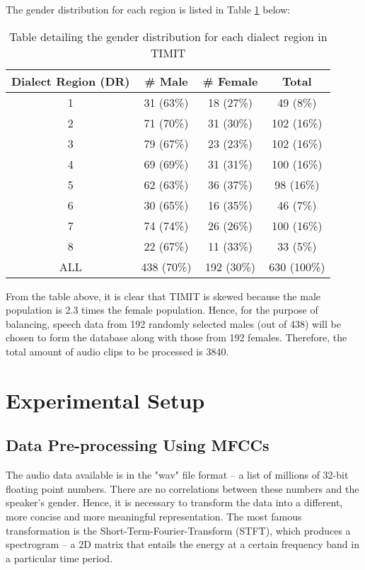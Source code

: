 \documentclass[11pt]{article}  %
\begin{document}
The gender distribution for each region is listed in Table \ref{table1} below:

\begin{table}[htbp]
	\begin{center}
		\begin{tabular}{|c|c|c|c|}
			\hline
			\textbf{Dialect Region (DR)}&\textbf{\# Male}&\textbf{\# Female}&\textbf{Total} \\
			\hline
			1 & 31 (63\%) & 18 (27\%) & 49 (8\%) \\
			\hline
			2 & 71 (70\%) & 31 (30\%) & 102 (16\%) \\
			\hline
			3 & 79 (67\%) & 23 (23\%) & 102 (16\%) \\
			\hline
			4 & 69 (69\%) & 31 (31\%) & 100 (16\%) \\
			\hline
			5 & 62 (63\%) & 36 (37\%) & 98 (16\%) \\
			\hline
			6 & 30 (65\%) & 16 (35\%) & 46 (7\%) \\
			\hline
			7 & 74 (74\%) & 26 (26\%) & 100 (16\%) \\
			\hline
			8 & 22 (67\%) & 11 (33\%) & 33 (5\%) \\
			\hline
			\rowcolor{LightCyan}
			ALL & 438 (70\%) & 192 (30\%) & 630 (100\%) \\
			\hline
		\end{tabular}
		\caption{Table detailing the gender distribution for each dialect region in TIMIT}
		\label{table1}
	\end{center}
\end{table}

From the table above, it is clear that TIMIT is skewed because the male population is 2.3 times the female population. Hence, for the purpose of balancing, speech data from 192 randomly selected males (out of 438) will be chosen to form the database along with those from 192 females. Therefore, the total amount of audio clips to be processed is 3840.

\section{Experimental Setup}
\label{experimental_setup}

\subsection{Data Pre-processing Using MFCCs}

The audio data available is in the "wav" file format -- a list of millions of 32-bit floating point numbers. There are no correlations between these numbers and the speaker's gender. Hence, it is necessary to transform the data into a different, more concise and more meaningful representation. The most famous transformation is the Short-Term-Fourier-Transform (STFT), which produces a spectrogram -- a 2D matrix that entails the energy at a certain frequency band in a particular time period. 
\end{document}
